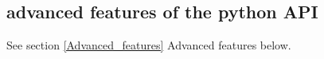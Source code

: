 \documentclass{revtex4}
\begin{document}
\subsection{advanced features of the python API}

See section \ref{Advanced_features} {Advanced features} below.

\end{document}
